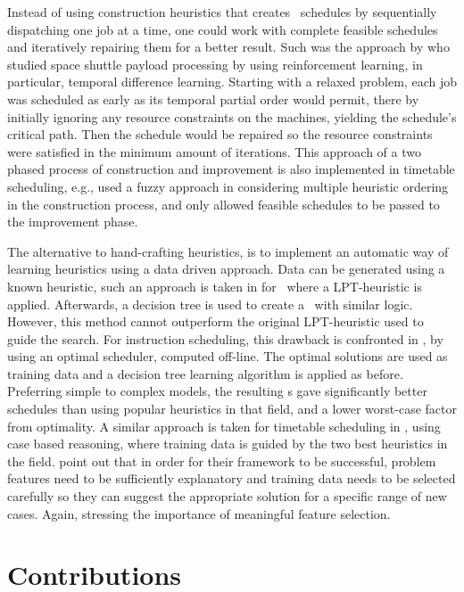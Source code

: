Instead of using construction heuristics that creates \jsp\ schedules by sequentially dispatching one job at a time, one could work with complete feasible schedules and iteratively repairing them for a better result. Such was the approach by \cite{Zhang95} who studied space shuttle payload processing by using reinforcement learning, in particular, temporal difference learning. Starting with a relaxed problem, each job was scheduled as early as its temporal partial order would permit, there by initially ignoring any resource constraints on the machines, yielding the schedule's critical path. Then the schedule would be repaired so the resource constraints were satisfied in the minimum amount of iterations.
This approach of a two phased process of construction and improvement is also implemented in timetable scheduling, e.g., \citet{Asmuni09} used a fuzzy approach in considering multiple heuristic ordering in the construction process, and only allowed feasible schedules to be passed to the improvement phase. 

The alternative to hand-crafting heuristics, is to implement an automatic way of learning heuristics using a data driven approach. %
Data can be generated using a known heuristic, such an approach is taken in 
\cite{Siggi05} for \jsp\, where a LPT-heuristic is applied. Afterwards, a 
decision tree is used to create a \dr\ with similar logic. However, this method 
cannot outperform the original LPT-heuristic used to guide the search. For 
instruction scheduling, this drawback is confronted in 
\citet{Malik08,Russell09,Siggi10}, by using an optimal scheduler, computed 
off-line. The optimal solutions are used as training data and a decision tree 
learning algorithm is applied as before. Preferring simple to complex models, 
the resulting \dr s gave significantly better schedules than using popular 
heuristics in that field, and a lower worst-case factor from optimality. A 
similar approach is taken for timetable scheduling in \cite{Burke06}, using 
case based reasoning, where training data is guided by the two best heuristics 
in the field. 
\citeauthor{Burke06} point out that in order for their framework to be 
successful, problem features need to be sufficiently explanatory and training 
data needs to be selected carefully so they can suggest the appropriate 
solution for a specific range of new cases. 
Again, stressing the importance of meaningful feature selection. 

\section{Contributions}

